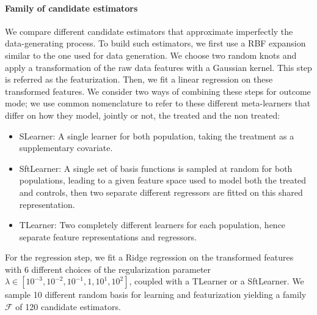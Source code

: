 \documentclass[11pt]{article}
\let\cite=\supercite
\begin{document}
%

\paragraph{Family of candidate estimators}

We compare different candidate estimators that approximate imperfectly the
data-generating process. To build such estimators, we first use a RBF
expansion similar to the one used for data generation. We choose two random
knots and apply a transformation of the raw data features with a Gaussian
kernel. This step is referred as the featurization. Then, we fit a linear
regression on these transformed features. We consider two ways of combining
these steps for outcome mode; we use common nomenclature
\cite{kunzel_metalearners_2019,shen2023rctrep} to refer to these different
meta-learners that differ on how they model, jointly or not, the treated and the
non treated:
\begin{itemize}
    \item SLearner: A single learner for both population, taking the treatment as
          a supplementary covariate.
    \item SftLearner: A single set of basis functions is sampled at random for both
          populations, leading to a given feature space used to model both the treated and
          controls, then two
          separate different regressors are fitted on this shared representation.
    \item TLearner: Two completely different learners for each population, hence
          separate feature representations and regressors.
\end{itemize}


For the regression step, we fit a Ridge regression on the transformed features
with 6 different choices of the regularization parameter $\lambda \in [10^{-3},
        10^{-2}, 10^{-1}, 1, 10^{1}, 10^{2}]$, coupled with a TLearner or a SftLearner.
We sample 10 different random basis for learning and
featurization yielding a family $\mathcal F$ of 120 candidate estimators.
%
\end{document}
